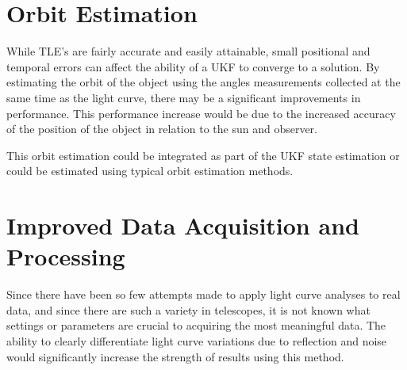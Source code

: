 \section{Orbit Estimation}

While TLE's are fairly accurate and easily attainable, small positional and temporal errors can affect the ability of a UKF to converge to a solution. By estimating the orbit of the object using the angles measurements collected at the same time as the light curve, there may be a significant improvements in performance. This performance increase would be due to the increased accuracy of the position of the object in relation to the sun and observer.

This orbit estimation could be integrated as part of the UKF state estimation or could be estimated using typical orbit estimation methods.

\section{Improved Data Acquisition and Processing}

Since there have been so few attempts made to apply light curve analyses to real data, and since there are such a variety in telescopes, it is not known what settings or parameters are crucial to acquiring the most meaningful data. The ability to clearly differentiate light curve variations due to reflection and noise would significantly increase the strength of results using this method.
